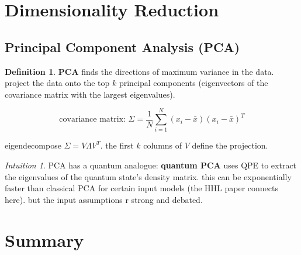 \documentclass[11pt,a4paper]{article}
\theoremstyle{definition}
\newtheorem{definition}{Definition}[section]
\theoremstyle{remark}
\newtheorem*{intuition}{Intuition}
\begin{document}
\section{Dimensionality Reduction}

\subsection{Principal Component Analysis (PCA)}

\begin{definition}
\textbf{PCA} finds the directions of maximum variance in the data. project the data onto the top $k$ principal components (eigenvectors of the covariance matrix with the largest eigenvalues).
\end{definition}

\[
\text{covariance matrix: } \Sigma = \frac{1}{N}\sum_{i=1}^N (x_i - \bar{x})(x_i - \bar{x})^T
\]

eigendecompose $\Sigma = V \Lambda V^T$. the first $k$ columns of $V$ define the projection.

\begin{intuition}
PCA has a quantum analogue: \textbf{quantum PCA} uses QPE to extract the eigenvalues of the quantum state's density matrix. this can be exponentially faster than classical PCA for certain input models (the HHL paper connects here). but the input assumptions r strong and debated.
\end{intuition}

\section{Summary}
\end{document}
